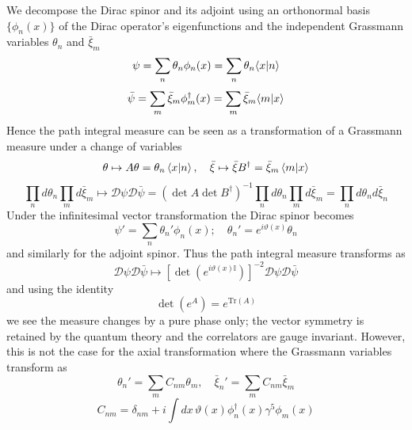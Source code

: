 \documentclass[11pt, a4paper]{article}
\theoremstyle{definition}
\theoremstyle{plain}
\begin{document}
We decompose the Dirac spinor and its adjoint using an orthonormal basis $\{ \phi_n(x) \}$ of
the Dirac operator's eigenfunctions and the independent Grassmann variables 
$\theta_n$ and $\bar{\xi}_m$
\begin{equation}
  \psi = \sum_n{\theta_n\phi_n(x)} = \sum_n{\theta_n\!\braket{x|n}}
\end{equation}
\begin{equation}
  \bar{\psi} = \sum_m{\bar{\xi}_m\phi^{\dagger}_m(x)} = \sum_m{\bar{\xi}_m\!\braket{m|x}}
  \end{equation}
Hence the path integral measure can be seen as a transformation of a Grassmann measure
under a change of variables
\begin{equation}
  \theta \mapsto A\theta = \theta_n\braket{x|n},\quad
  \bar{\xi} \mapsto \bar{\xi}B^{\dagger} = \bar{\xi}_m\braket{m|x}
\end{equation}
\begin{equation}
  \prod_n{d\theta_n}\prod_m{d\bar{\xi}_m} \mapsto \mathcal{D}\psi\mathcal{D}\bar{\psi}
  = {(\det{A}\det{B^\dagger})}^{-1}\prod_n{d\theta_n}\prod_m{d\bar{\xi}_m}
  = \prod_n{d\theta_n d\bar{\xi}_n} 
\end{equation}
Under the infinitesimal vector transformation the Dirac spinor becomes
\begin{equation}
  \psi' = \sum_n{\theta_n'\phi_n(x)} ;\quad \theta_n' = e^{i\vartheta(x)}\theta_n
\end{equation}
and similarly for the adjoint spinor. Thus the path integral measure transforms as
\begin{equation}
  \mathcal{D}\psi\mathcal{D}\bar{\psi} \mapsto
  {\left[\det\left(e^{i\vartheta(x)\mathbb{I}}\right)\right]}^{-2} \mathcal{D}\psi\mathcal{D}\bar{\psi}
\end{equation}
and using the identity
\begin{equation}
  \det\left( e^{A}\right) = e^{\mathrm{Tr}(A)}
\end{equation}
we see the measure changes by a pure phase only; the vector symmetry is retained
by the quantum theory and the correlators are gauge invariant.
However, this is not the case for the axial transformation
where the Grassmann variables transform as
\begin{equation}
  \theta_n' = \sum_m{C_{nm} \theta_m} ,\quad \bar{\xi}_n' = \sum_m{C_{nm} \bar{\xi}_m}
\end{equation}
\begin{equation}
  C_{nm} = \delta_{nm} +i\int{dx\, \vartheta(x)\phi_{n}^{\dagger}(x)\gamma^5\phi_m(x)}
\end{equation}
\end{document}
